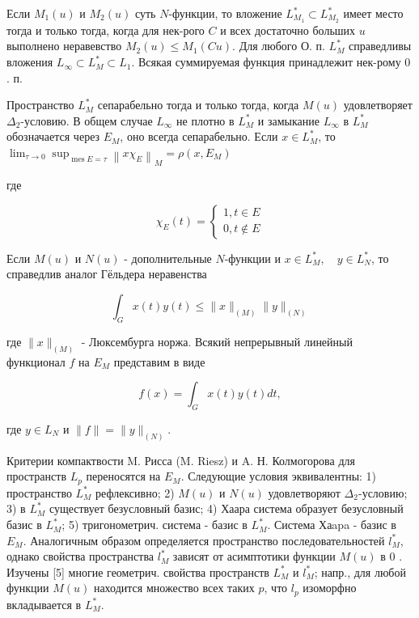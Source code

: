 \documentclass[10pt]{article}
\begin{document}
Если $M_{1}(u)$ и $M_{2}(u)$ суть $N$-функции, то вложение $L_{M_{1}}^{*} \subset L_{M_{2}}^{*}$ имеет место тогда и только тогда, когда для нек-рого $C$ и всех достаточно больших $u$ выполнено неравевство $M_{2}(u) \leqslant M_{1}(C u)$. Для любого О. п. $L_{M}^{*}$ справедливы вложения $L_{\infty} \subset L_{M}^{*} \subset L_{1}$. Всякая суммируемая функция принадлежит нек-рому 0 . п.



Пространство $L_{M}^{*}$ сепарабельно тогда и только тогда, когда $M(u)$ удовлетворяет $\Delta_{2}$-условию. В общем случае $L_{\infty}$ не плотно в $L_{M}^{*}$ и замыкание $L_{\infty}$ в $L_{M}^{*}$ обозначается через $E_{M}$, оно всегда сепарабельно. Если $x \in L_{M}^{*}$, то $\lim _{\tau \rightarrow 0} \sup _{\operatorname{mes} E=\tau}\left\|x \chi_{E}\right\|_{M}=\rho\left(x, E_{M}\right)$



где



\[

\chi_{E}(t)=\left\{\begin{array}{l}

1, t \in E \\

0, t \notin E

\end{array}\right.

\]



Если $M(u)$ и $N(u)$ - дополнительные $N$-функции и $x \in L_{M}^{*}, \quad y \in L_{N}^{*}$, то справедлив аналог Гёльдера неравенства



\[

\int_{G} x(t) y(t) \leqslant\|x\|_{(M)}\|y\|_{(N)}

\]



где $\|x\|_{(M)}$ - Люксембурга норжа. Всякий непрерывный линейный функционал $f$ на $E_{M}$ представим в виде



\[

f(x)=\int_{G} x(t) y(t) d t,

\]



где $y \in L_{N}$ и $\|f\|=\|y\|_{(N)}$.



Критерии компактвости M. Рисса (M. Riesz) и A. Н. Колмогорова для пространств $L_{p}$ переносятся на $E_{M}$. Следующие условия эквивалентны: 1) пространство $L_{M}^{*}$ рефлексивно; 2) $M(u)$ и $N(u)$ удовлетворяют $\Delta_{2}$-условию; 3) в $L_{M}^{*}$ существует безусловный базис; 4) Хаара система образует безусловный базис в $L_{M}^{*}$; 5) тригонометрич. система - базис в $L_{M}^{*}$. Система Хаapa - базис в $E_{M}$. Аналогичным образом определяется пространство последовательностей $l_{M}^{*}$, однако свойства пространства $l_{M}^{*}$ зависят от асимптотики функции $M(u)$ в 0 . Изучены [5] многие геометрич. свойства пространств $L_{M}^{*}$ и $l_{M}^{*}$; напр., для любой функции $M(u)$ находится множество всех таких $p$, что $l_{p}$ изоморфно вкладывается в $L_{M}^{*}$.
\end{document}
